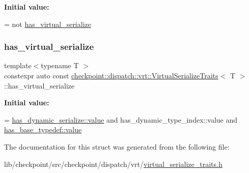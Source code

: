 {\bfseries Initial value\+:}
\begin{DoxyCode}
=
    not \hyperlink{structcheckpoint_1_1dispatch_1_1vrt_1_1_virtual_serialize_traits_a21d83fdae98269101791620d64160887}{has\_virtual\_serialize}
\end{DoxyCode}
\mbox{\label{structcheckpoint_1_1dispatch_1_1vrt_1_1_virtual_serialize_traits_a21d83fdae98269101791620d64160887}} 
\subsubsection{\texorpdfstring{has\+\_\+virtual\+\_\+serialize}{has\_virtual\_serialize}}
{\footnotesize\ttfamily template$<$typename T $>$ \\
constexpr auto const \hyperlink{structcheckpoint_1_1dispatch_1_1vrt_1_1_virtual_serialize_traits}{checkpoint\+::dispatch\+::vrt\+::\+Virtual\+Serialize\+Traits}$<$ T $>$\+::has\+\_\+virtual\+\_\+serialize\hspace{0.3cm}{\ttfamily [static]}}

{\bfseries Initial value\+:}
\begin{DoxyCode}
=
    \hyperlink{structdetection_1_1detector_a6d7d0e1bdf5903db9edbe448edccf83b}{has\_dynamic\_serialize::value} and
    has\_dynamic\_type\_index::value and
    \hyperlink{structdetection_1_1detector_a6d7d0e1bdf5903db9edbe448edccf83b}{has\_base\_typedef::value}
\end{DoxyCode}


The documentation for this struct was generated from the following file\+:\begin{DoxyCompactItemize}
\item 
lib/checkpoint/src/checkpoint/dispatch/vrt/\hyperlink{virtual__serialize__traits_8h}{virtual\+\_\+serialize\+\_\+traits.\+h}\end{DoxyCompactItemize}
